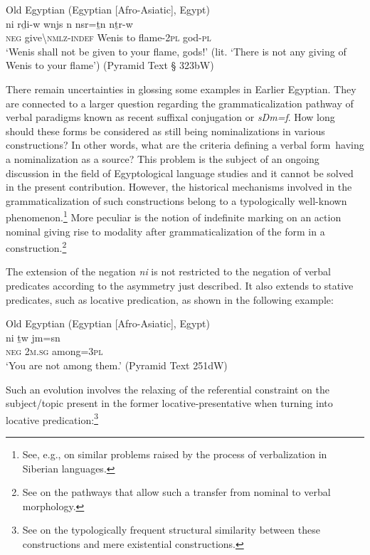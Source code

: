 \documentclass[output=paper]{langsci/langscibook}
\newcommand{\ꜥ}{ʿ}
\newcommand{\ꜣ}{\kern-.25pt\texttt{ꜣ}\kern-.6pt}
\begin{document}
\ea Old Egyptian (Egyptian [Afro-Asiatic], Egypt) \label{ex:AE10}\\ 
	\gll ni rḏi-w wnjs n nsr=ṯn nṯr-w\\
	\textsc{neg} give\textbackslash\textsc{nmlz-indef} Wenis to flame-\textsc{2pl} god-\textsc{pl}\\ 
	\glt ‘Wenis shall not be given to your flame, gods!’ (lit. ‘There is not any giving of Wenis to your flame’) (Pyramid Text § 323bW)
\z 	

There remain uncertainties in glossing some examples in Earlier Egyptian. They are connected to a larger question regarding the grammaticalization pathway of verbal paradigms known as recent suffixal conjugation or \textit{sDm=f}. How long should these forms be considered as still being nominalizations in various constructions? In other words, what are the criteria defining a verbal form having a nominalization as a source? This problem is the subject of an ongoing discussion in the field of Egyptological language studies and it cannot be solved in the present contribution. However, the historical mechanisms involved in the grammaticalization of such constructions belong to a typologically well-known phenomenon.\footnote{See, e.g., \citet{Malchukov2013} on similar problems raised by the process of verbalization in Siberian languages.} More peculiar is the notion of indefinite marking on an action nominal giving rise to modality after grammaticalization of the form in a construction.\footnote{See \citet{Oreal2017} on the pathways that allow such a transfer from nominal to verbal morphology.}

The extension of the negation \textit{ni} is not restricted to the negation of verbal predicates according to the asymmetry just described. It also extends to stative predicates, such as locative predication, as shown in the following example:

\ea Old Egyptian (Egyptian [Afro-Asiatic], Egypt) \label{ex:AE11}\\
	\gll ni ṯw jm=sn\\
	\textsc{neg} \textsc{2m.sg} among=\textsc{3pl}\\
	\glt ‘You are not among them.’ (Pyramid Text 251dW)
\z 

Such an evolution involves the relaxing of the referential constraint on the subject/topic present in the former locative-presentative when turning into locative predication:\footnote{See \citet[108]{Veselinova2013} on the typologically frequent structural similarity between these constructions and mere existential constructions.}
\end{document}
